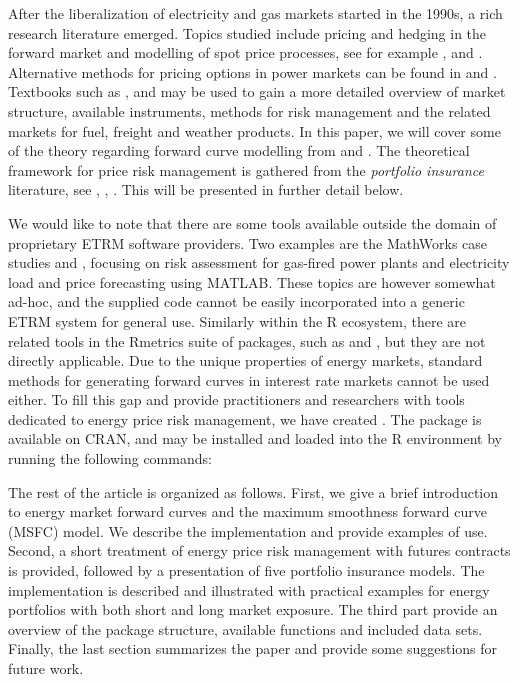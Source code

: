 After the liberalization of electricity and gas markets started in the 1990s, a rich research literature emerged. Topics studied include pricing and hedging in the forward market and modelling of spot price processes, see for example \citet{bessembinder2002equilibrium}, \citet{janczura2013identifying} and \citet{benth2007non}. Alternative methods for pricing options in power markets can be found in \citet{burger2004spot} and \citet{benth2014pricing}. Textbooks such as \citet{eydeland2002energy}, \citet{benth2008stochastic} and \citet{kirschen2018fundamentals} may be used to gain a more detailed overview of market structure, available instruments, methods for risk management and the related markets for fuel, freight and weather products. In this paper, we will cover some of the theory regarding forward curve modelling from \citet{ollmar2003analysis} and \citet{benth2007extracting}. The theoretical framework for price risk management is gathered from the \textit{portfolio insurance} literature, see \citet{Leland1980WhoSB}, \citet{perold1988dynamic}, \citet{leland1976evolution}. This will be presented in further detail below.

We would like to note that there are some tools available outside the domain of proprietary ETRM software providers. Two examples are the MathWorks case studies \citet{Sundar} and \citet{Deoras}, focusing on risk assessment for gas-fired power plants and electricity load and price forecasting using MATLAB. These topics are however somewhat ad-hoc, and the supplied code cannot be easily incorporated into a generic ETRM system for general use. Similarly within the R ecosystem, there are related tools in the Rmetrics suite of packages, such as  and , but they are not directly applicable. Due to the unique properties of energy markets, standard methods for generating forward curves in interest rate markets cannot be used either. To fill this gap and provide practitioners and researchers with tools dedicated to energy price risk management, we have created . The package is available on CRAN, and may be installed and loaded into the R environment by running the following commands:
\begin{example*}
\end{example*}

The rest of the article is organized as follows. First, we give a brief introduction to energy market forward curves and the maximum smoothness forward curve (MSFC) model. We describe the  implementation and provide examples of use. Second, a short treatment of energy price risk management with futures contracts is provided, followed by a presentation of five portfolio insurance models. The  implementation is described and illustrated with practical examples for energy portfolios with both short and long market exposure. The third part provide an overview of the  package structure, available functions and included data sets. Finally, the last section summarizes the paper and provide some suggestions for future work. 


